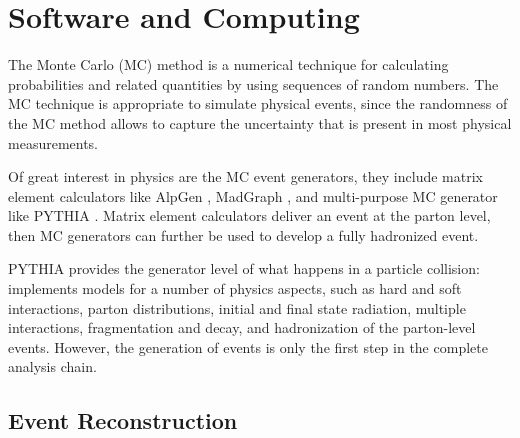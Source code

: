 \section{Software and Computing}
The Monte Carlo (MC) method is a numerical technique for calculating probabilities and related quantities by using sequences of random numbers. The MC technique is appropriate to simulate physical events, since the randomness of the MC method allows to capture the uncertainty that is present in most physical measurements. 

Of great interest in physics are the MC event generators, they include matrix element calculators like AlpGen \cite{Mangano:2002ea}, MadGraph \cite{Maltoni:2002qb}, and multi-purpose MC generator like PYTHIA \cite{Sjostrand:2007gs}. Matrix element calculators deliver an event at the parton level, then MC generators can further be used to develop a fully hadronized event. 

PYTHIA provides the generator level of what happens in a particle collision: implements models for a number of physics aspects, such as hard and soft interactions, parton distributions, initial and final state radiation, multiple interactions, fragmentation and decay, and hadronization of the parton-level events. However, the generation of events is only the first step in the complete analysis chain.

\subsection{Event Reconstruction}

